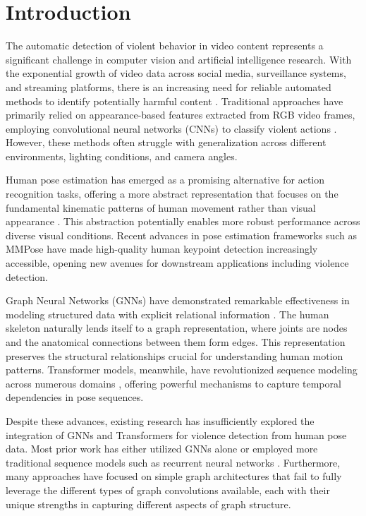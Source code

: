 \documentclass[conference]{IEEEtran}
\begin{document}
\section{Introduction}
The automatic detection of violent behavior in video content represents a significant challenge in computer vision and artificial intelligence research. With the exponential growth of video data across social media, surveillance systems, and streaming platforms, there is an increasing need for reliable automated methods to identify potentially harmful content \cite{demarty2014violent}. Traditional approaches have primarily relied on appearance-based features extracted from RGB video frames, employing convolutional neural networks (CNNs) to classify violent actions \cite{sudhakaran2017learning}. However, these methods often struggle with generalization across different environments, lighting conditions, and camera angles.

Human pose estimation has emerged as a promising alternative for action recognition tasks, offering a more abstract representation that focuses on the fundamental kinematic patterns of human movement rather than visual appearance \cite{liu2020disentangling}. This abstraction potentially enables more robust performance across diverse visual conditions. Recent advances in pose estimation frameworks such as MMPose \cite{mmpose2020} have made high-quality human keypoint detection increasingly accessible, opening new avenues for downstream applications including violence detection.

Graph Neural Networks (GNNs) have demonstrated remarkable effectiveness in modeling structured data with explicit relational information \cite{kipf2017semi, velivckovic2018graph}. The human skeleton naturally lends itself to a graph representation, where joints are nodes and the anatomical connections between them form edges. This representation preserves the structural relationships crucial for understanding human motion patterns. Transformer models, meanwhile, have revolutionized sequence modeling across numerous domains \cite{vaswani2017attention}, offering powerful mechanisms to capture temporal dependencies in pose sequences.

Despite these advances, existing research has insufficiently explored the integration of GNNs and Transformers for violence detection from human pose data. Most prior work has either utilized GNNs alone \cite{yan2018spatial} or employed more traditional sequence models such as recurrent neural networks \cite{li2019actional}. Furthermore, many approaches have focused on simple graph architectures that fail to fully leverage the different types of graph convolutions available, each with their unique strengths in capturing different aspects of graph structure.
\end{document}
